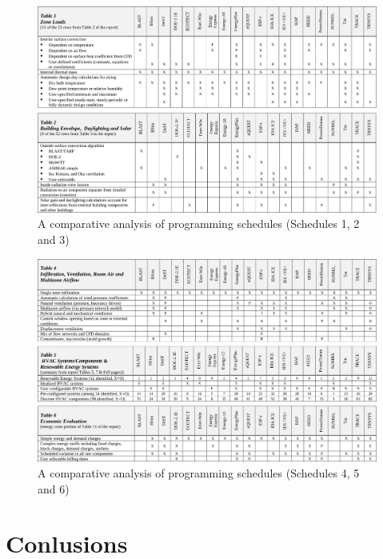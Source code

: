 \begin{figure}
\includegraphics[width=\textwidth]{./Images/9-SimProg1}
\caption[Simulation Programs Comparative Analysis A]{A comparative analysis of programming schedules (Schedules 1, 2 and 3) \cite{crawley05}}
\label{fig:SimProg1}
\end{figure}

\begin{figure}
\includegraphics[width=\textwidth]{./Images/10-SimProg2}
\caption[Simulation Programs Comparative Analysis B]{A comparative analysis of programming schedules (Schedules 4, 5 and 6) \cite{crawley05}}
\label{fig:SimProg2}
\end{figure}

\clearpage
\section{Conlusions}

